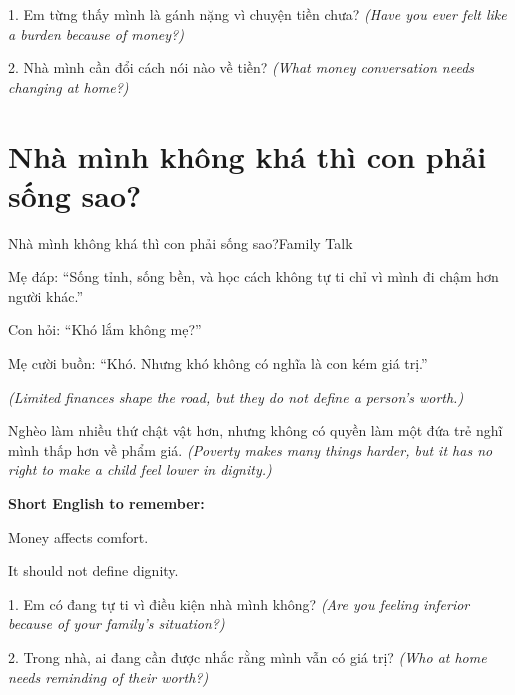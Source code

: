 \begin{tuhocnhanh}
1. Em từng thấy mình là gánh nặng vì chuyện tiền chưa? \textit{(Have you ever felt like a burden because of money?)}

2. Nhà mình cần đổi cách nói nào về tiền? \textit{(What money conversation needs changing at home?)}
\end{tuhocnhanh}
\ngancach

\section{Nhà mình không khá thì con phải sống sao?}
\begin{truyen}{Nhà mình không khá thì con phải sống sao?}{Family Talk}

Mẹ đáp: ``Sống tỉnh, sống bền, và học cách không tự ti chỉ vì mình đi chậm hơn người khác.''

Con hỏi: ``Khó lắm không mẹ?''

Mẹ cười buồn: ``Khó. Nhưng khó không có nghĩa là con kém giá trị.''

\textit{(Limited finances shape the road, but they do not define a person's worth.)}
\end{truyen}

\begin{baihoc}
Nghèo làm nhiều thứ chật vật hơn, nhưng không có quyền làm một đứa trẻ nghĩ mình thấp hơn về phẩm giá.
\textit{(Poverty makes many things harder, but it has no right to make a child feel lower in dignity.)}
\end{baihoc}

\begin{ghinhoanh}
\textbf{Short English to remember:}

Money affects comfort.

It should not define dignity.
\end{ghinhoanh}

\begin{tuhocnhanh}
1. Em có đang tự ti vì điều kiện nhà mình không? \textit{(Are you feeling inferior because of your family's situation?)}

2. Trong nhà, ai đang cần được nhắc rằng mình vẫn có giá trị? \textit{(Who at home needs reminding of their worth?)}
\end{tuhocnhanh}
\ngancach

